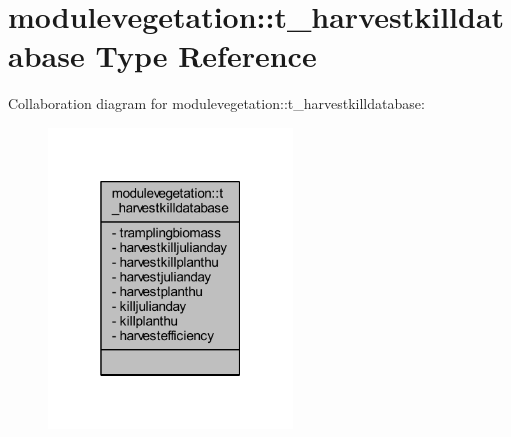 \hypertarget{structmodulevegetation_1_1t__harvestkilldatabase}{}\section{modulevegetation\+:\+:t\+\_\+harvestkilldatabase Type Reference}
\label{structmodulevegetation_1_1t__harvestkilldatabase}


Collaboration diagram for modulevegetation\+:\+:t\+\_\+harvestkilldatabase\+:\nopagebreak
\begin{figure}[H]
\begin{center}
\leavevmode
\includegraphics[width=184pt]{structmodulevegetation_1_1t__harvestkilldatabase__coll__graph}
\end{center}
\end{figure}
